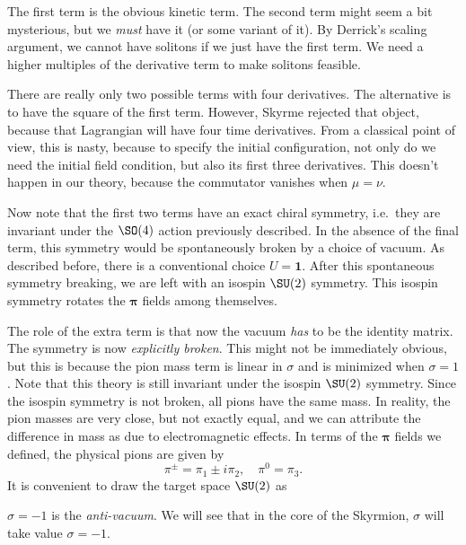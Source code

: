 \documentclass[a4paper]{article}
\begin{document}
The first term is the obvious kinetic term. The second term might seem a bit mysterious, but we \emph{must} have it (or some variant of it). By Derrick's scaling argument, we cannot have solitons if we just have the first term. We need a higher multiples of the derivative term to make solitons feasible.

There are really only two possible terms with four derivatives. The alternative is to have the square of the first term. However, Skyrme rejected that object, because that Lagrangian will have four time derivatives. From a classical point of view, this is nasty, because to specify the initial configuration, not only do we need the initial field condition, but also its first three derivatives. This doesn't happen in our theory, because the commutator vanishes when $\mu = \nu$.

Now note that the first two terms have an exact chiral symmetry, i.e.\ they are invariant under the $\SO(4)$ action previously described. In the absence of the final term, this symmetry would be spontaneously broken by a choice of vacuum. As described before, there is a conventional choice $U = \mathbf{1}$. After this spontaneous symmetry breaking, we are left with an isospin $\SU(2)$ symmetry. This isospin symmetry rotates the $\boldsymbol\pi$ fields among themselves.

The role of the extra term is that now the vacuum \emph{has} to be the identity matrix. The symmetry is now \emph{explicitly broken}. This might not be immediately obvious, but this is because the pion mass term is linear in $\sigma$ and is minimized when $\sigma = 1$. Note that this theory is still invariant under the isospin $\SU(2)$ symmetry. Since the isospin symmetry is not broken, all pions have the same mass. In reality, the pion masses are very close, but not exactly equal, and we can attribute the difference in mass as due to electromagnetic effects. In terms of the $\boldsymbol\pi$ fields we defined, the physical pions are given by
\[
  \pi^{\pm} = \pi_1 \pm i \pi_2,\quad \pi^0 = \pi_3.
\]
It is convenient to draw the target space $\SU(2)$ as
\begin{center}
\end{center}
$\sigma = -1$ is the \emph{anti-vacuum}. We will see that in the core of the Skyrmion, $\sigma$ will take value $\sigma = -1$.
\end{document}
